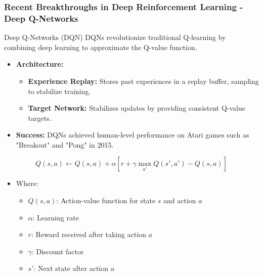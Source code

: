 \documentclass[aspectratio=169]{beamer}
\begin{document}
\begin{frame}[fragile]
    \frametitle{Recent Breakthroughs in Deep Reinforcement Learning - Deep Q-Networks}
    \begin{block}{Deep Q-Networks (DQN)}
        DQNs revolutionize traditional Q-learning by combining deep learning to approximate the Q-value function.
    \end{block}
    
    \begin{itemize}
        \item \textbf{Architecture:}
            \begin{itemize}
                \item \textbf{Experience Replay:} Stores past experiences in a replay buffer, sampling to stabilize training.
                \item \textbf{Target Network:} Stabilizes updates by providing consistent Q-value targets.
            \end{itemize}
        \item \textbf{Success:} DQNs achieved human-level performance on Atari games such as "Breakout" and "Pong" in 2015.
    \end{itemize}

    \begin{equation}
        Q(s, a) \leftarrow Q(s, a) + \alpha [r + \gamma \max_{a'} Q(s', a') - Q(s, a)]
    \end{equation}
    \begin{itemize}
        \item Where:
            \begin{itemize}
                \item \( Q(s, a) \): Action-value function for state \( s \) and action \( a \)
                \item \( \alpha \): Learning rate
                \item \( r \): Reward received after taking action \( a \)
                \item \( \gamma \): Discount factor
                \item \( s' \): Next state after action \( a \)
            \end{itemize}
    \end{itemize}
\end{frame}
\end{document}
